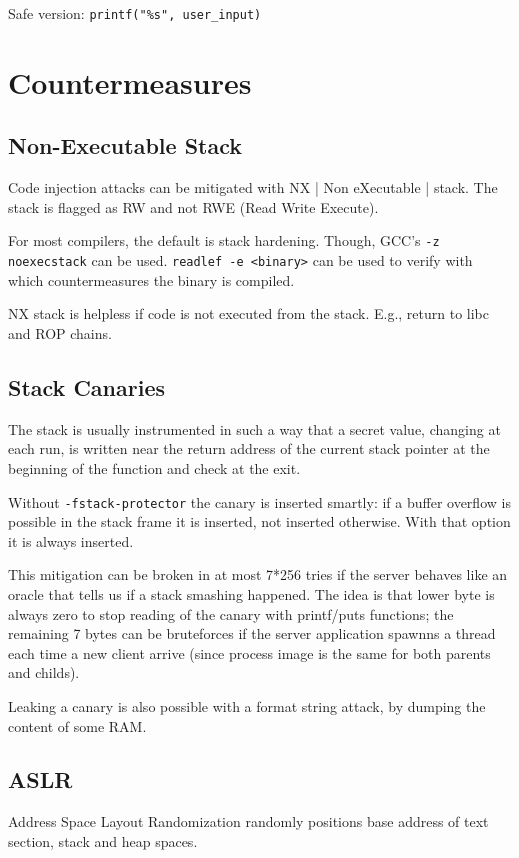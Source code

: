 Safe version: \texttt{printf("\%s", user_input)}

\section{Countermeasures}
\subsection{Non-Executable Stack}
Code injection attacks can be mitigated with NX | Non eXecutable | stack. The stack is flagged as RW and not RWE (Read Write Execute).

For most compilers, the default is stack hardening. Though, GCC's \texttt{-z noexecstack} can be used. \texttt{readlef -e <binary>} can be used to verify with which countermeasures the binary is compiled.

NX stack is helpless if code is not executed from the stack. E.g., return to libc and ROP chains.

\subsection{Stack Canaries}
The stack is usually instrumented in such a way that a secret value, changing at each run, is written near the return address of the current stack pointer at the beginning of the function and check at the exit.

Without \texttt{-fstack-protector} the canary is inserted smartly: if a buffer overflow is possible in the stack frame it is inserted, not inserted otherwise.
With that option it is always inserted.

This mitigation can be broken in at most 7*256 tries if the server behaves like an oracle that tells us if a stack smashing happened.
The idea is that lower byte is always zero to stop reading of the canary with printf/puts functions; the remaining 7 bytes can be bruteforces if the server application spawnns a thread each time a new client arrive (since process image is the same for both parents and childs).

Leaking a canary is also possible with a format string attack, by dumping the content of some RAM.

\subsection{ASLR}
Address Space Layout Randomization randomly positions base address of text section, stack and heap spaces.

